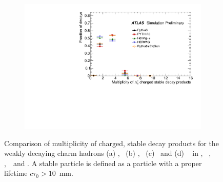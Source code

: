 \begin{figure}
\begin{subfigure}[]{0.45\textwidth}
\end{subfigure}
\begin{subfigure}[]{0.45\textwidth}
\includegraphics[width=\textwidth]{evtgen/figures/EvtGen/Lambdac+/h_species_ncharge.pdf}
\end{subfigure}
\caption{Comparison of multiplicity of charged, stable decay products for the weakly decaying 
charm hadrons 
(a) \Dzero,~ (b) \Dplus,~ (c) \Ds\ and (d) \Lc~
in \PythiaE,~ \Pythia,~ \Herwigpp,~\Herwig\ and \EvtGen.  A stable particle is defined
as a particle with a proper lifetime $c\tau_{0}>10$~mm. } 
\label{fig:ccharge}
\end{figure}

